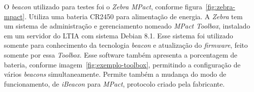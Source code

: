 \documentclass[
	12pt,				%
	openright,			%
	oneside,			%
	a4paper,			%
	chapter=TITLE,		%
	english,			%
	brazil				%
	]{abntex2}
\begin{document}
{\begin{figure}[h!]
\end{figure}

O \textit{beacon} utilizado para testes foi o \textit{Zebra MPact}, conforme figura~\ref{fig:zebra-mpact}. Utiliza uma bateria CR2450 para alimentação de energia. A \textit{Zebra} tem um sistema de administração e gerenciamento nomeado \textit{MPact Toolbox}, instalado em um servidor do LTIA com sistema Debian 8.1. Esse sistema foi utilizado somente para conhecimento da tecnologia \textit{beacon} e atualização do \textit{firmware}, feito somente por essa \textit{Toolbox}. Esse software também apresenta a porcentagem de bateria, conforme imagem~\ref{fig:exemplo-toolbox}, permitindo a configuração de vários \textit{beacons} simultaneamente. Permite também a mudança do modo de funcionamento, de \textit{iBeacon} para \textit{MPact}, protocolo criado pela fabricante.

\begin{figure}[h!]
\end{figure}

}
\end{document}
